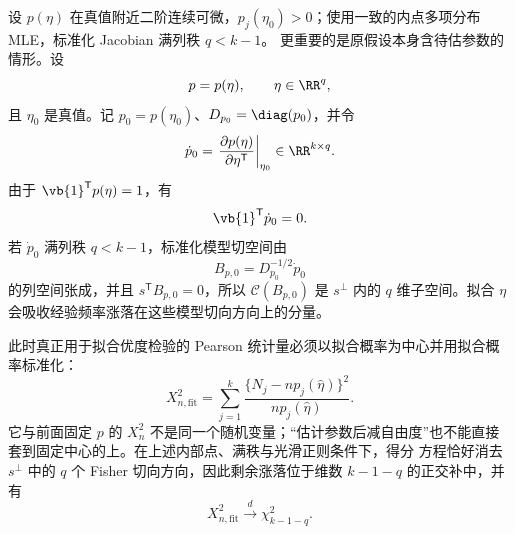 \begin{theorem}
设 $p(\eta)$ 在真值附近二阶连续可微，$p_j(\eta_0)>0$；使用一致的内点多项分布 MLE，标准化 Jacobian 满列秩 $q<k-1$。
更重要的是原假设本身含待估参数的情形。设
\[
 p=p(\eta),
 \qquad
 \eta\in\RR^q,
\]
且 $\eta_0$ 是真值。记 $p_0=p(\eta_0)$、$D_{p_0}=\diag(p_0)$，并令
\[
 \dot p_0
 =\left.
 \frac{\partial p(\eta)}{\partial\eta^{\mathsf T}}
 \right|_{\eta_0}
 \in\RR^{k\times q}.
\]
由于 $\vb{1}^{\mathsf T}p(\eta)=1$，有
\[
 \vb{1}^{\mathsf T}\dot p_0=0.
\]
若 $\dot p_0$ 满列秩 $q<k-1$，标准化模型切空间由
\[
 B_{p,0}=D_{p_0}^{-1/2}\dot p_0
\]
的列空间张成，并且 $s^{\mathsf T}B_{p,0}=0$，所以 $\mathcal C(B_{p,0})$ 是 $s^\perp$ 内的 $q$ 维子空间。拟合 $\eta$ 会吸收经验频率涨落在这些模型切向方向上的分量。

此时真正用于拟合优度检验的 Pearson 统计量必须以拟合概率为中心并用拟合概率标准化：
\[
 X_{n,\mathrm{fit}}^2
 =\sum_{j=1}^k
 \frac{\{N_j-np_j(\widehat\eta)\}^2}
 {np_j(\widehat\eta)}.
\]
它与前面固定 $p$ 的 $X_n^2$ 不是同一个随机变量；“估计参数后减自由度”也不能直接套到固定中心的上。在上述内部点、满秩与光滑正则条件下，得分 方程恰好消去 $s^\perp$ 中的 $q$ 个 Fisher 切向方向，因此剩余涨落位于维数 $k-1-q$ 的正交补中，并有
\begin{equation}\label{eq:math-stat-pearson-fitted-df}
 X_{n,\mathrm{fit}}^2\xrightarrow{d}\chi^2_{k-1-q}.
\end{equation}
\end{theorem}


